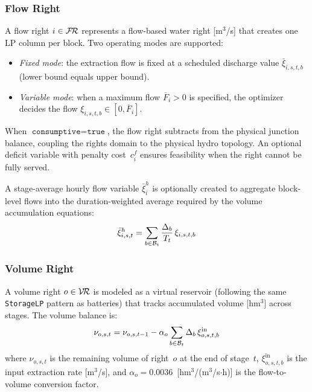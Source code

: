 \subsubsection{Flow Right}

A flow right $i \in \mathcal{F\!R}$ represents a flow-based water right
[m$^3$/s] that creates one LP column per block.  Two operating modes
are supported:
\begin{itemize}
  \item \emph{Fixed mode}: the extraction flow is fixed at a scheduled
    discharge value $\bar{\xi}_{i,s,t,b}$ (lower bound equals upper
    bound).
  \item \emph{Variable mode}: when a maximum flow $\overline{F}_i > 0$
    is specified, the optimizer decides the flow
    $\xi_{i,s,t,b} \in [0, \overline{F}_i]$.
\end{itemize}

When $\texttt{consumptive} = \texttt{true}$, the flow right subtracts
from the physical junction balance, coupling the rights domain to the
physical hydro topology.  An optional deficit variable with penalty
cost~$c_i^f$ ensures feasibility when the right cannot be fully served.

A stage-average hourly flow variable $\bar{\xi}^h_i$ is optionally
created to aggregate block-level flows into the duration-weighted
average required by the volume accumulation equations:
\begin{equation}
\label{eq:fr_avg}
\bar{\xi}^h_{i,s,t} = \sum_{b \in \mathcal{B}_t}
  \frac{\Delta_b}{T_t} \, \xi_{i,s,t,b}
\end{equation}

\subsubsection{Volume Right}

A volume right $o \in \mathcal{V\!R}$ is modeled as a virtual reservoir
(following the same \texttt{StorageLP} pattern as batteries) that
tracks accumulated volume [hm$^3$] across stages.  The volume balance
is:
\begin{equation}
\label{eq:vr_balance}
\nu_{o,s,t} = \nu_{o,s,t-1}
  - \alpha_o \sum_{b \in \mathcal{B}_t} \Delta_b \, \xi^\text{in}_{o,s,t,b}
\end{equation}
where $\nu_{o,s,t}$ is the remaining volume of right~$o$ at the end of
stage~$t$, $\xi^\text{in}_{o,s,t,b}$ is the input extraction rate
[m$^3$/s], and $\alpha_o = 0.0036$~[hm$^3$/(m$^3$/s$\cdot$h)] is the
flow-to-volume conversion factor.

